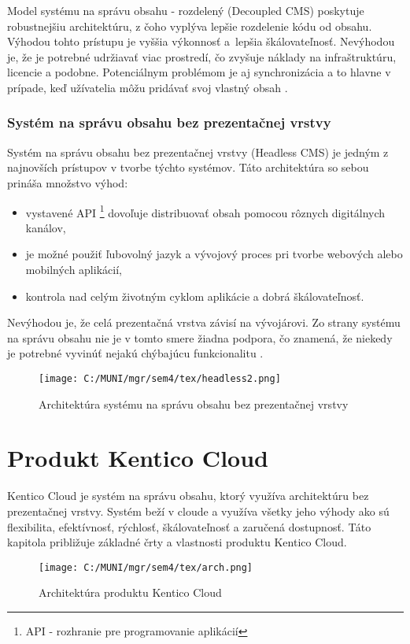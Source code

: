 \documentclass[
  printed, %
  table,   %
  lof,     %
  nolot,     %
  twoside,  
]{fithesis3}
\begin{document}
Model systému na správu obsahu - rozdelený (Decoupled CMS) poskytuje robustnejšiu architektúru, z čoho vyplýva lepšie rozdelenie kódu od obsahu. Výhodou tohto prístupu je vyššia výkonnosť a~lepšia škálovateľnosť. Nevýhodou je, že je potrebné udržiavať viac prostredí, čo zvyšuje náklady na infraštruktúru, licencie a podobne. Potenciálnym problémom je aj synchronizácia a to hlavne v prípade, keď užívatelia môžu pridávať svoj vlastný obsah \cite{cmsGuide}.

\subsection{Systém na správu obsahu bez prezentačnej vrstvy}
Systém na správu obsahu bez prezentačnej vrstvy (Headless CMS) je jedným z najnovších prístupov v tvorbe týchto systémov. Táto architektúra so sebou prináša množstvo výhod:
\begin{itemize}
	\item vystavené API \footnote{API - rozhranie pre programovanie aplikácií} dovoľuje distribuovať obsah pomocou rôznych digitálnych kanálov, 
	\item je možné použiť ľubovolný jazyk a vývojový proces pri tvorbe webových alebo mobilných aplikácií,
	\item kontrola nad celým životným cyklom aplikácie a dobrá škálovateľnosť.
\end{itemize}

Nevýhodou je, že celá prezentačná vrstva závisí na vývojárovi. Zo strany systému na správu obsahu nie je v tomto smere žiadna podpora, čo znamená, že niekedy je potrebné vyvinúť nejakú chýbajúcu funkcionalitu \cite{cmsGuide}.
\begin{figure}[h]
  \begin{center}
        \texttt{[image: C:/MUNI/mgr/sem4/tex/headless2.png]}
  \end{center}
  \caption{Architektúra systému na správu obsahu bez prezentačnej vrstvy}
  \label{fig:headless}
\end{figure}


\chapter{Produkt Kentico Cloud}
Kentico Cloud je systém na správu obsahu, ktorý využíva architektúru bez prezentačnej vrstvy. Systém beží v cloude a využíva všetky jeho výhody ako sú flexibilita, efektívnosť, rýchlosť, škálovateľnosť a zaručená dostupnosť. Táto kapitola približuje základné črty a vlastnosti produktu Kentico Cloud.
\begin{figure}[h]
  \begin{center}
        \texttt{[image: C:/MUNI/mgr/sem4/tex/arch.png]}
  \end{center}
  \caption{Architektúra produktu Kentico Cloud \cite{cmsGuide}}
  \label{fig:kc}
\end{figure}
\end{document}
